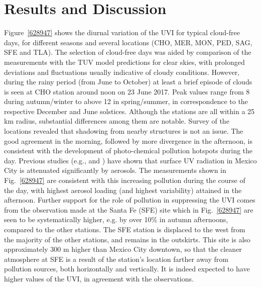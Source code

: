 \documentclass[journal=jacsat,manuscript=article]{achemso}
\begin{document}
\section{Results and Discussion}
\label{results-and-discussion}

Figure~{\ref{628947}} shows the diurnal variation of
the UVI for typical cloud-free days, for different seasons and
several locations (CHO, MER, MON, PED, SAG, SFE and TLA).
The selection of cloud-free days was aided by comparison of the measurements
with the TUV model predictions for clear skies, with prolonged deviations and
fluctuations usually indicative of cloudy conditions. However,
during the rainy period (from June to October) at least a brief episode of clouds
is seen at CHO station around noon on 23 June
2017. Peak values range from 8 during autumn/winter to above 12
in spring/summer, in correspondence to the respective December and June
solstices. Although the stations are all within a 25 km radius,
substantial differences among them are notable. Survey of the locations
revealed that shadowing from nearby structures is not an issue. The good
agreement in the morning, followed by more divergence in the afternoon,
is consistent with the development of photo-chemical pollution hotspots
during the day. Previous studies (e.g., \citet{Castro_2001} and
\citet{Palancar_2013}) have shown
that surface UV radiation in Mexico City is attenuated significantly by
aerosols. The measurements shown in Fig.~{\ref{628947}}
are consistent with this increasing pollution during the course of the
day, with highest aerosol loading (and highest variability) attained in
the afternoon. Further support for the role of pollution in suppressing
the UVI comes from the observation made at the Santa Fe (SFE) site which
in Fig.~{\ref{628947}} are seen to be systematically
higher, e.g. by over 10\% in autumn afternoons, compared to the other
stations. The SFE station is displaced to the west from the majority of
the other stations, and remains in the outskirts. This site is also
approximately 300 m higher than Mexico City downtown, so that the cleaner atmosphere at SFE
is a result of the station’s location farther away from pollution sources,
both horizontally and vertically.\citep{SEDEMA2018a} It is indeed expected to have
higher values of the UVI, in agreement with the observations.
\end{document}
